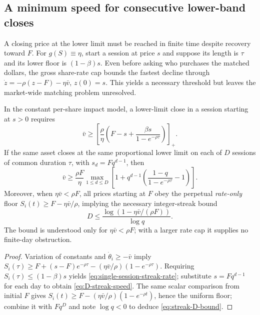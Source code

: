 \documentclass[review,hidelinks,onefignum,onetabnum]{siamonline250211}
\begin{document}
\subsection{A minimum speed for consecutive lower-band closes}\label{subsec:multiday-rate}
A closing price at the lower limit must be reached in finite time despite recovery toward $F$. For $g(S)\equiv\eta$, start a session at price $s$ and suppose its length is $\tau$ and its lower floor is $(1-\beta)s$. Even before asking who purchases the matched dollars, the gross share-rate cap bounds the fastest decline through $\dot z=-\rho(z-F)-\eta\bar v$, $z(0)=s$. This yields a necessary threshold but leaves the market-wide matching problem unresolved.
\begin{proposition}\label{prop:rolling-rate}
In the constant per-share impact model, a lower-limit close in a session starting at $s>0$ requires
\begin{equation}\label{eq:single-session-streak-rate}
 \quad\bar v\ge \left[\frac{\rho}{\eta}\left(F-s+
 \frac{\beta s}{1-e^{-\rho\tau}}\right)\right]_+.\quad
\end{equation}
If the same asset closes at the same proportional lower limit on each of $D$ sessions of common duration $\tau$, with $s_d=Fq^{d-1}$, then
\begin{equation}\label{eq:D-streak-speed}
\quad\bar v\ge\frac{\rho F}{\eta}\max_{1\le d\le D}
 \left[1+q^{d-1}\left(\frac{1-q}{1-e^{-\rho\tau}}-1\right)\right].\quad
\end{equation}
Moreover, when $\eta\bar v<\rho F$, all prices starting at $F$ obey the perpetual \emph{rate-only} floor $S_i(t)\ge F-\eta\bar v/\rho$, implying the necessary integer-streak bound
\begin{equation}\label{eq:streak-D-bound}
\quad D\le\frac{\log(1-\eta\bar v/(\rho F))}{\log q}.\quad
\end{equation}
The bound is understood only for $\eta\bar v<\rho F$; with a larger rate cap it supplies no finite-day obstruction.
\end{proposition}
\begin{proof}
Variation of constants and $\dot\theta_i\ge-\bar v$ imply
$S_i(\tau)\ge F+(s-F)e^{-\rho\tau}-(\eta\bar v/\rho)(1-e^{-\rho\tau})$.
Requiring $S_i(\tau)\le(1-\beta)s$ yields \eqref{eq:single-session-streak-rate}; substitute $s=Fq^{d-1}$ for each day to obtain \eqref{eq:D-streak-speed}. The same scalar comparison from initial $F$ gives $S_i(t)\ge F-(\eta\bar v/\rho)(1-e^{-\rho t})$, hence the uniform floor; combine it with $Fq^D$ and note $\log q<0$ to deduce \eqref{eq:streak-D-bound}.
\end{proof}
\end{document}
